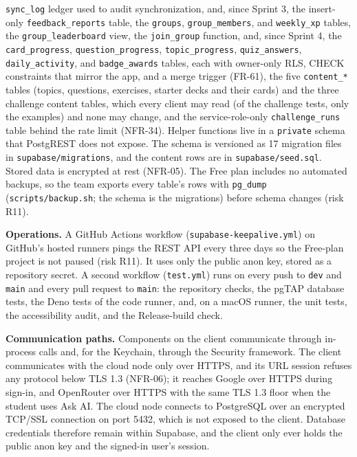 \documentclass[12pt,letterpaper]{article}
\begin{document}
\begin{itemize}
        \texttt{sync\_log} ledger used to audit synchronization, and, since Sprint 3,
        the insert-only \texttt{feedback\_reports} table, the \texttt{groups},
        \texttt{group\_members}, and \texttt{weekly\_xp} tables, the
        \texttt{group\_leaderboard} view, the \texttt{join\_group} function, and,
        since Sprint 4, the \texttt{card\_progress}, \texttt{question\_progress},
        \texttt{topic\_progress}, \texttt{quiz\_answers}, \texttt{daily\_activity},
        and \texttt{badge\_awards} tables, each with owner-only RLS, CHECK
        constraints that mirror the app, and a merge trigger (FR-61), the five
        \texttt{content\_*} tables (topics, questions, exercises, starter decks and
        their cards) and the three challenge content tables, which every client may
        read (of the challenge tests, only the examples) and none may change, and the
        service-role-only \texttt{challenge\_runs} table behind the rate limit (NFR-34). Helper
        functions live in a \texttt{private} schema that PostgREST does not expose. The
        schema is versioned as 17 migration files in \texttt{supabase/migrations}, and
        the content rows are in \texttt{supabase/seed.sql}. Stored data is
        encrypted at rest (NFR-05). The Free plan includes no automated backups, so
        the team exports every table's rows with \texttt{pg\_dump}
        (\texttt{scripts/backup.sh}; the schema is the migrations) before schema
        changes (risk R11).
\end{itemize}

\textbf{Operations.} A GitHub Actions workflow (\texttt{supabase-keepalive.yml}) on
GitHub's hosted runners pings the REST API every three days so the Free-plan project is
not paused (risk R11). It uses only the public anon key, stored as a repository
secret. A second workflow (\texttt{test.yml}) runs on every push to \texttt{dev} and
\texttt{main} and every pull request to \texttt{main}: the repository checks, the
pgTAP database tests, the Deno tests of the code runner, and, on a macOS runner, the unit tests, the accessibility audit,
and the Release-build check.

\textbf{Communication paths.} Components on the client communicate through in-process
calls and, for the Keychain, through the Security framework. The client communicates
with the cloud node only over HTTPS, and its URL session refuses any protocol below
TLS 1.3 (NFR-06); it reaches Google over HTTPS during sign-in, and OpenRouter over
HTTPS with the same TLS 1.3 floor when the student uses Ask AI. The cloud node
connects to PostgreSQL over an encrypted TCP/SSL connection on port 5432, which is not
exposed to the client. Database credentials therefore remain within Supabase, and the
client only ever holds the public anon key and the signed-in user's session.
\end{document}
